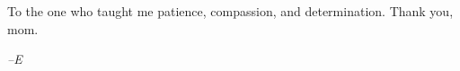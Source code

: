 
\begin{dedication}
To the one who taught me patience, compassion, and determination. Thank you, mom.

\begin{center}
\emph{--E}
\end{center}
\end{dedication}